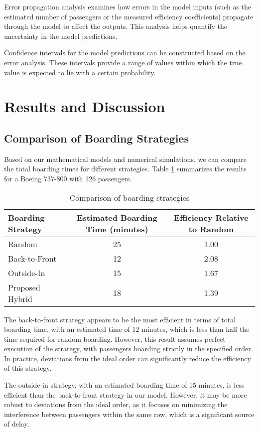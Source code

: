 Error propagation analysis examines how errors in the model inputs (such as the estimated number of passengers or the measured efficiency coefficients) propagate through the model to affect the outputs. This analysis helps quantify the uncertainty in the model predictions.

Confidence intervals for the model predictions can be constructed based on the error analysis. These intervals provide a range of values within which the true value is expected to lie with a certain probability.

\section{Results and Discussion}
\subsection{Comparison of Boarding Strategies}

Based on our mathematical models and numerical simulations, we can compare the total boarding times for different strategies. Table \ref{tab:boarding_comparison} summarizes the results for a Boeing 737-800 with 126 passengers.

\begin{table}[H]
\centering
\begin{tabular}{|l|c|c|}
\hline
\textbf{Boarding Strategy} & \textbf{Estimated Boarding Time (minutes)} & \textbf{Efficiency Relative to Random} \\ \hline
Random & 25 & 1.00 \\ \hline
Back-to-Front & 12 & 2.08 \\ \hline
Outside-In & 15 & 1.67 \\ \hline
Proposed Hybrid & 18 & 1.39 \\ \hline
\end{tabular}
\caption{Comparison of boarding strategies}
\label{tab:boarding_comparison}
\end{table}

The back-to-front strategy appears to be the most efficient in terms of total boarding time, with an estimated time of 12 minutes, which is less than half the time required for random boarding. However, this result assumes perfect execution of the strategy, with passengers boarding strictly in the specified order. In practice, deviations from the ideal order can significantly reduce the efficiency of this strategy.

The outside-in strategy, with an estimated boarding time of 15 minutes, is less efficient than the back-to-front strategy in our model. However, it may be more robust to deviations from the ideal order, as it focuses on minimizing the interference between passengers within the same row, which is a significant source of delay.

